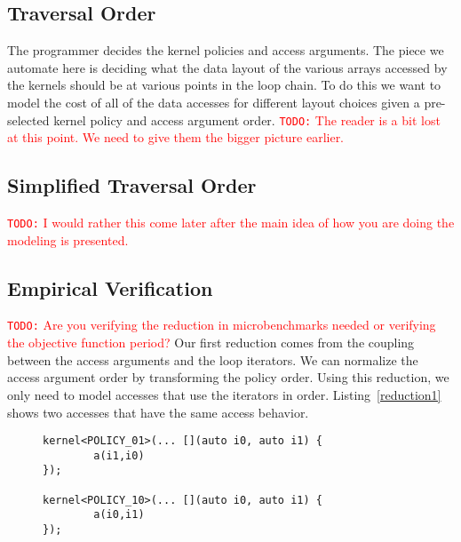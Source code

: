 \documentclass[sigconf, table]{acmart}
\newcommand{\todo}[1]{{\textcolor{red}{{\tt{TODO:}}\,\,#1 }}}
\begin{document}
\subsection{Traversal Order}

The programmer decides the kernel policies and access arguments.
The piece we automate here is deciding what the data layout of the various arrays accessed by
the kernels should be at various points in the loop chain.
To do this we want to model the cost of all of the data accesses for different layout choices
given a pre-selected kernel policy and access argument order.
\todo{The reader is a bit lost at this point.  We need to give them the bigger picture earlier.}



\subsection{Simplified Traversal Order}

\todo{I would rather this come later after the main idea of how you are doing the modeling is presented.}

\subsection{Empirical Verification}

\todo{Are you verifying the reduction in microbenchmarks needed or verifying the objective function period?}
Our first reduction comes from the coupling between the access arguments and the loop iterators. We can normalize the access argument order by transforming the policy order. Using this reduction, we only need to model accesses that use the iterators in order. Listing~\ref{reduction1} shows two accesses that have the same access behavior. 

\begin{figure}
	\begin{lstlisting}[caption={Equivalent loops for first reduction process.}, label={reduction1}]
kernel<POLICY_01>(... [](auto i0, auto i1) {
		a(i1,i0)
});

kernel<POLICY_10>(... [](auto i0, auto i1) {
		a(i0,i1)
});
	\end{lstlisting}
\end{figure}
\end{document}
